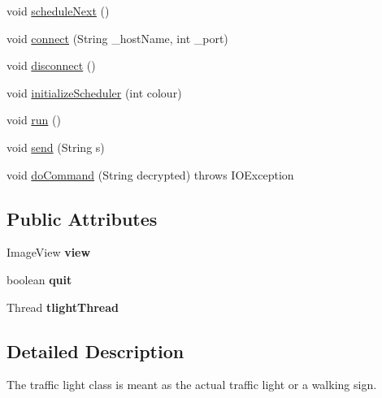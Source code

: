 \begin{DoxyCompactItemize}
\item 
void \hyperlink{classbackend_1_1_traffic_light_a2dae4e4bfeedec1232e759580fbd2f8c}{schedule\+Next} ()
\item 
void \hyperlink{classbackend_1_1_traffic_light_a4dd4e39baf73d8eff0385fd794944eb8}{connect} (String \+\_\+host\+Name, int \+\_\+port)
\item 
void \hyperlink{classbackend_1_1_traffic_light_aee505c8f323e1e2c3663e9a9fe0a90f1}{disconnect} ()
\item 
void \hyperlink{classbackend_1_1_traffic_light_ad84d11094e93d1ca839c97c27ac55f48}{initialize\+Scheduler} (int colour)
\item 
void \hyperlink{classbackend_1_1_traffic_light_a3853f64679ecfcf4c13db7acbaba9c19}{run} ()
\item 
void \hyperlink{classbackend_1_1_traffic_light_a80ff066019e22052573b8ab47c655040}{send} (String s)
\item 
void \hyperlink{classbackend_1_1_traffic_light_ac9f6beaf190c5cb4b50fee8b5e0f909c}{do\+Command} (String decrypted)  throws I\+O\+Exception
\end{DoxyCompactItemize}
\subsection*{Public Attributes}
\begin{DoxyCompactItemize}
\item 
Image\+View {\bfseries view}\hypertarget{classbackend_1_1_traffic_light_a76ecbec9c0244e880c8c849150dbdb69}{}\label{classbackend_1_1_traffic_light_a76ecbec9c0244e880c8c849150dbdb69}

\item 
boolean {\bfseries quit}\hypertarget{classbackend_1_1_traffic_light_ad789b37270d95c493d611d67757987c3}{}\label{classbackend_1_1_traffic_light_ad789b37270d95c493d611d67757987c3}

\item 
Thread {\bfseries tlight\+Thread}\hypertarget{classbackend_1_1_traffic_light_aa8c9e0459fb06dfa8ab52a39b01ff1a2}{}\label{classbackend_1_1_traffic_light_aa8c9e0459fb06dfa8ab52a39b01ff1a2}

\end{DoxyCompactItemize}


\subsection{Detailed Description}
The traffic light class is meant as the actual traffic light or a walking sign.

